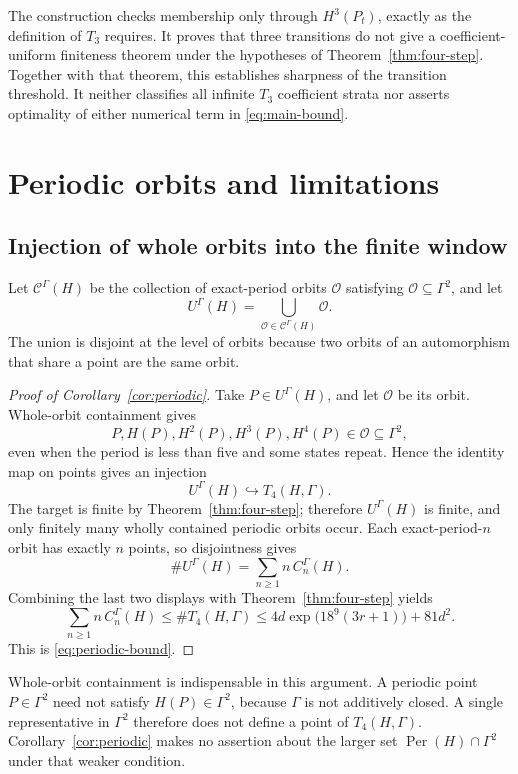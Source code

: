 \documentclass[11pt]{article}
\theoremstyle{definition}
\theoremstyle{remark}
\begin{document}
The construction checks membership only through \(H^3(P_t)\), exactly as
the definition of \(T_3\) requires.  It proves that three transitions do not
give a coefficient-uniform finiteness theorem under the hypotheses of
Theorem~\ref{thm:four-step}.  Together with that theorem, this establishes
sharpness of the transition threshold.  It neither classifies all infinite
\(T_3\) coefficient strata nor asserts optimality of either numerical term
in \eqref{eq:main-bound}.

\section{Periodic orbits and limitations}\label{sec:periodic}

\subsection{Injection of whole orbits into the finite window}

Let \(\mathcal C^\Gamma(H)\) be the collection of exact-period orbits
\(\mathcal O\) satisfying \(\mathcal O\subseteq\Gamma^2\), and let
\[
 U^\Gamma(H)=\bigcup_{\mathcal O\in\mathcal C^\Gamma(H)}\mathcal O.
\]
The union is disjoint at the level of orbits because two orbits of an
automorphism that share a point are the same orbit.

\begin{proof}[Proof of Corollary~\ref{cor:periodic}]
Take \(P\in U^\Gamma(H)\), and let \(\mathcal O\) be its orbit.  Whole-orbit
containment gives
\[
 P,H(P),H^2(P),H^3(P),H^4(P)\in\mathcal O\subseteq\Gamma^2,
\]
even when the period is less than five and some states repeat.  Hence the
identity map on points gives an injection
\[
 U^\Gamma(H)\hookrightarrow T_4(H,\Gamma).
\]
The target is finite by Theorem~\ref{thm:four-step}; therefore
\(U^\Gamma(H)\) is finite, and only finitely many wholly contained periodic
orbits occur.  Each exact-period-\(n\) orbit has exactly \(n\) points, so
disjointness gives
\[
 \#U^\Gamma(H)=\sum_{n\ge1}n\,C_n^\Gamma(H).
\]
Combining the last two displays with Theorem~\ref{thm:four-step} yields
\[
 \sum_{n\ge1}n\,C_n^\Gamma(H)
 \le \#T_4(H,\Gamma)
 \le
 4d\exp\!\bigl(18^9(3r+1)\bigr)+81d^2.
\]
This is \eqref{eq:periodic-bound}.
\end{proof}

Whole-orbit containment is indispensable in this argument.  A periodic point
\(P\in\Gamma^2\) need not satisfy \(H(P)\in\Gamma^2\), because
\(\Gamma\) is not additively closed.  A single representative in
\(\Gamma^2\) therefore does not define a point of \(T_4(H,\Gamma)\).
Corollary~\ref{cor:periodic} makes no assertion about the larger set
\(\operatorname{Per}(H)\cap\Gamma^2\) under that weaker condition.
\end{document}
